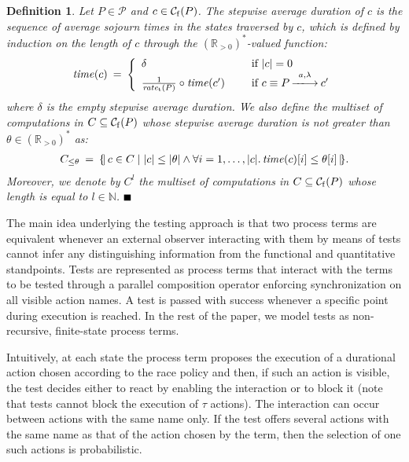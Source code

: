 \documentclass[copyright,creativecommons]{eptcs}
\newtheorem{new_definition}
	[new_theorem]{Definition}
\newenvironment{definition}
	{\begin{new_definition}\rm}
	{\end{new_definition}}
\def\ms#1{\null\ifmmode\mathord{\mathcode`-="702D\it #1\mathcode`\-="2200}\else$\mathord{\mathcode`-="702D\it #1\mathcode`\-="2200}$\fi}
\newcommand{\lmp}
	{\{ \! | \,}
\newcommand{\rmp}
	{\, | \! \}}
\newcommand{\calc}
        {\mathcal{C}}
\newcommand{\calp}
        {\mathcal{P}}
\newcommand{\natns}
	{\mathbb{N}}
\newcommand{\realns}
	{\mathbb{R}}
\newcommand{\arrow}[2]
        {\, {\auxarrow\limits^{#1}}_{#2} \,}
\newcommand{\auxarrow}
	{\mathop{- \!\! - \!\!\!\! \longrightarrow}}
\newcommand{\fullbox}
	{{\mbox{}\nolinebreak\hfill{$\rule{2mm}{2mm}$}}}
\begin{document}
	\begin{definition}

Let $P \in \calp$ and $c \in \calc_{\rm f}(P)$. The stepwise average duration of $c$ is the sequence of average sojourn times 
in the states traversed by $c$, which is defined by induction on the length of $c$ through the $(\realns_{> 0})^{*}$-valued 
function:
\[\begin{array}{c}
\ms{time}(c) \: = \: \left\{ \begin{array}{ll}
\delta &
\hspace{0.5cm} \textrm{if $|c| = 0$} \\
{1 \over \ms{rate}_{\rm t}(P)} \circ \ms{time}(c') &
\hspace{0.5cm} \textrm{if $c \equiv P \arrow{a, \lambda}{} c'$} \\
\end{array} \right.
\end{array}\]
where $\delta$ is the empty stepwise average duration. We also define the multiset of computations in
$C \subseteq \calc_{\rm f}(P)$ whose stepwise average duration is not greater than $\theta \in (\realns_{> 0})^{*}$ as:
\[
\begin{array}{l}
C_{\le \theta} \: = \: \lmp c \in C \mid |c| \le |\theta| \land \forall i = 1, \dots, |c| \ldotp
\ms{time}(c)[i] \le \theta[i] \rmp.
\end{array}\]
Moreover, we denote by $C^{l}$ the multiset of computations in $C \subseteq \calc_{\rm f}(P)$ whose length
is equal to $l \in \natns$.
\fullbox
	\end{definition}

The main idea underlying the testing approach is that two process terms are equivalent whenever an external observer 
interacting with them by means of tests cannot infer any distinguishing information from the functional and quantitative 
standpoints. Tests are represented as process terms that interact with the terms to be tested through a parallel composition 
operator enforcing synchronization on all visible action names. A test is passed with success whenever a specific point 
during execution is reached.
In the rest of the paper, we model tests as non-recursive, finite-state process terms.

Intuitively, at each state the process term proposes the execution of a durational action chosen according to the race
policy and then, if such an action is visible, the test decides either to react by enabling the interaction or to block it
(note that tests cannot block the execution of $\tau$ actions). 
The interaction can occur between actions with the same name only. If the test offers several actions with the same name as 
that of the action chosen by the term, then the selection of one such actions is probabilistic.
\end{document}
